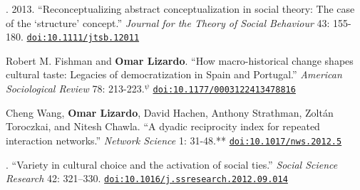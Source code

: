 . 2013. ``Reconceptualizing abstract conceptualization in social theory: The case of the ‘structure’ concept.'' {\em Journal for the Theory of Social Behaviour} 43: 155-180. \href{https://doi.org/10.1111/jtsb.12011}{\nolinkurl{doi:10.1111/jtsb.12011}} 

\ind Robert M. Fishman and {\bf Omar Lizardo}. ``How macro-historical change shapes cultural taste: Legacies of democratization in Spain and Portugal.'' {\em American Sociological Review} 78: 213-223.\textcolor{black}{$^{\psi}$} \href{https://doi.org/10.1177/0003122413478816}{\nolinkurl{doi:10.1177/0003122413478816}}

\ind Cheng Wang, {\bf Omar Lizardo}, David Hachen, Anthony Strathman, Zolt\'{a}n Toroczkai, and Nitesh Chawla. ``A dyadic reciprocity index for repeated interaction networks.'' {\em Network Science} 1: 31-48.\textcolor{uclablue}{**} \href{https://doi.org/10.1017/nws.2012.5}{\nolinkurl{doi:10.1017/nws.2012.5}}

. ``Variety in cultural choice and the activation of social ties.'' {\em Social Science Research} 42: 321–330. \href{https://doi.org/10.1016/j.ssresearch.2012.09.014}{\nolinkurl{doi:10.1016/j.ssresearch.2012.09.014}}